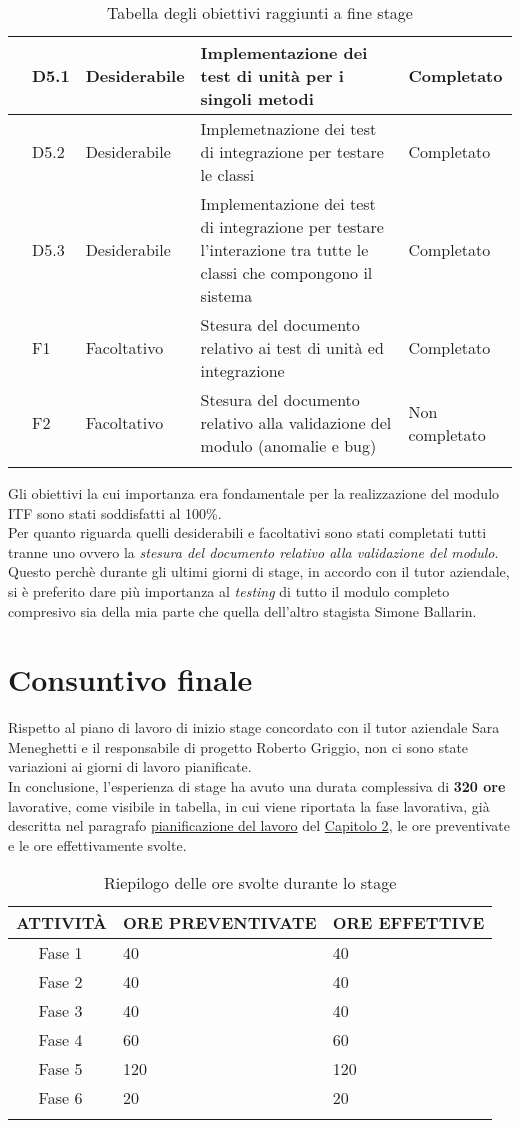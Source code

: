 \begin{longtable}{|r l|p{3cm}|p{8cm}|p{2cm}|}
	& D5.1 & Desiderabile & Implementazione dei test di unità per i singoli metodi & Completato\\\hline
	& D5.2 & Desiderabile & Implemetnazione dei test di integrazione per testare le classi & Completato\\\hline
	& D5.3 & Desiderabile & Implementazione dei test di integrazione per testare l'interazione tra tutte le classi che compongono il sistema & Completato\\\hline
	& F1 & Facoltativo & Stesura del documento relativo ai test di unità ed integrazione & Completato\\\hline	
	& F2 & Facoltativo & Stesura del documento relativo alla validazione del modulo (anomalie e bug) & Non completato\\\hline
	\caption{Tabella degli obiettivi raggiunti a fine stage}
\end{longtable}
Gli obiettivi la cui importanza era fondamentale per la realizzazione del modulo \gls{ITF} sono stati soddisfatti al 100\%.\\
Per quanto riguarda quelli desiderabili e facoltativi sono stati completati tutti tranne uno ovvero la\textit{ stesura del documento relativo alla validazione del modulo}. Questo perchè durante gli ultimi giorni di stage, in accordo con il tutor aziendale, si è preferito dare più importanza al \textit{testing} di tutto il modulo completo compresivo sia della mia parte che quella dell'altro stagista Simone Ballarin.
\section{Consuntivo finale}
Rispetto al piano di lavoro di inizio stage concordato con il tutor aziendale Sara Meneghetti e il responsabile di progetto Roberto Griggio, non ci sono state variazioni ai giorni di lavoro pianificate.\\
In conclusione, l'esperienza di stage ha avuto una durata complessiva di \textbf{320 ore} lavorative, come visibile in tabella, in cui viene riportata la fase lavorativa, già descritta nel paragrafo \hyperref[sec:pianificazione_del_lavoro]{pianificazione del lavoro} del \hyperref[cap:tecnologie_e_strumenti]{Capitolo 2}, le ore preventivate e le ore effettivamente svolte. 
\begin{longtable}{|r l|p{5cm}|p{4cm}|}
	\hline
	\multicolumn{2}{|c|}{\textbf{ATTIVITÀ}} & \textbf{ORE PREVENTIVATE} & \textbf{ORE EFFETTIVE}\tabularnewline
	\hline
	& Fase 1 & \centerline{40} & \centerline{40} \\\hline	
	& Fase 2 & \centerline{40} & \centerline{40}\\\hline
	& Fase 3 & \centerline{40} & \centerline{40}\\\hline
	& Fase 4 & \centerline{60} & \centerline{60}\\\hline
	& Fase 5 & \centerline{120} & \centerline{120}\\\hline
	& Fase 6 & \centerline{20} & \centerline{20}\\\hline	
	\caption{Riepilogo delle ore svolte durante lo stage}
\end{longtable}
